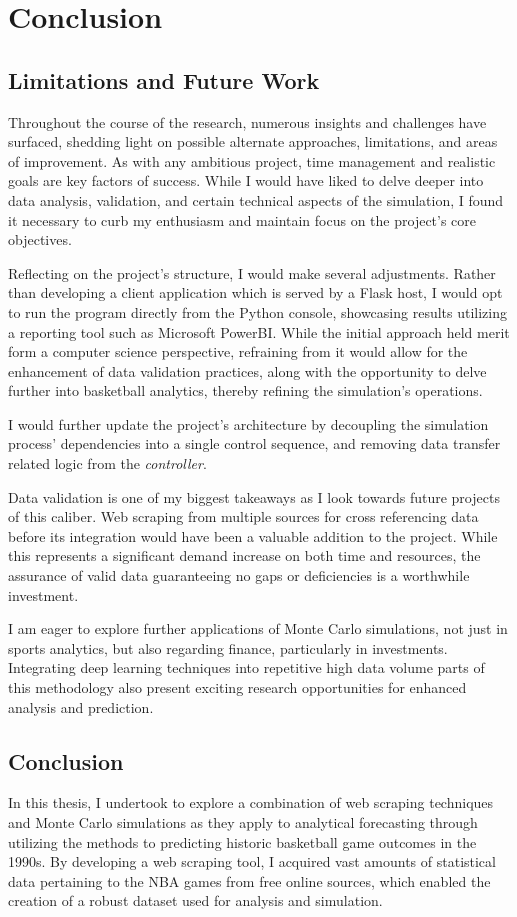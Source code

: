 \documentclass{thesis-ekf}
\theoremstyle{definition}
\theoremstyle{remark}
\begin{document}
\chapter{Conclusion}
\section{Limitations and Future Work}
Throughout the course of the research, numerous insights and challenges have surfaced, shedding light on possible alternate approaches, limitations, and areas of improvement. As with any ambitious project, time management and realistic goals are key factors of success. While I would have liked to delve deeper into data analysis, validation, and certain technical aspects of the simulation, I found it necessary to curb my enthusiasm and maintain focus on the project's core objectives.

Reflecting on the project's structure, I would make several adjustments. Rather than developing a client application which is served by a Flask host, I would opt to run the program directly from the Python console, showcasing results utilizing a reporting tool such as Microsoft PowerBI. While the initial approach held merit form a computer science perspective, refraining from it would allow for the enhancement of data validation practices, along with the opportunity to delve further into basketball analytics, thereby refining the simulation's operations.

I would further update the project's architecture by decoupling the simulation process' dependencies into a single control sequence, and removing data transfer related logic from the \emph{controller}.

Data validation is one of my biggest takeaways as I look towards future projects of this caliber. Web scraping from multiple sources for cross referencing data before its integration would have been a valuable addition to the project. While this represents a significant demand increase on both time and resources, the assurance of valid data guaranteeing no gaps or deficiencies is a worthwhile investment.

I am eager to explore further applications of Monte Carlo simulations, not just in sports analytics, but also regarding finance, particularly in investments. Integrating deep learning techniques into repetitive high data volume parts of this methodology also present exciting research opportunities for enhanced analysis and prediction.

\section{Conclusion}
In this thesis, I undertook to explore a combination of web scraping techniques and Monte Carlo simulations as they apply to analytical forecasting through utilizing the methods to predicting historic basketball game outcomes in the 1990s. By developing a web scraping tool, I acquired vast amounts of statistical data pertaining to the NBA games from free online sources, which enabled the creation of a robust dataset used for analysis and simulation.
\end{document}
